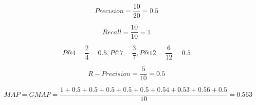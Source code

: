 \begin{boxC}
    \begin{equation*}
        Precision = \frac{10}{20} = 0.5
    \end{equation*}

    \begin{equation*}
        Recall = \frac{10}{10} = 1
    \end{equation*}

    \begin{equation*}
        P@4 = \frac{2}{4} = 0.5 , P@7 = \frac{3}{7} , P@12 = \frac{6}{12} = 0.5
    \end{equation*}

    \begin{equation*}
        R-Precision = \frac{5}{10} = 0.5
    \end{equation*}

    \begin{equation*}
        MAP = GMAP = \frac{1 + 0.5 + 0.5 + 0.5 + 0.5 + 0.5 + 0.54 + 0.53 + 0.56 + 0.5 }{10} = 0.563 %
    \end{equation*}

\end{boxC}